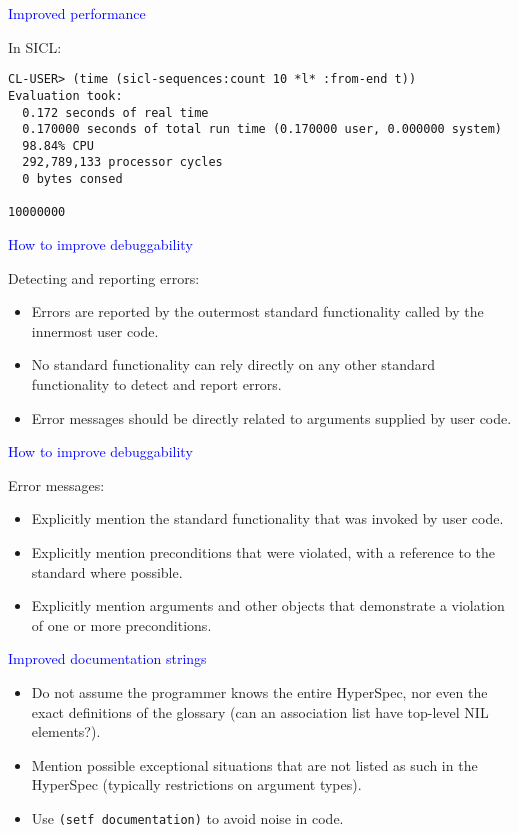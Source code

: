 \documentclass{slides}
\newcommand{\ti}[1]{\begin{center}\Large{\textcolor{blue}{#1}}\end{center}}
\begin{document}
\begin{slide}\ti{Improved performance}
In SICL:
\small
\begin{verbatim}
CL-USER> (time (sicl-sequences:count 10 *l* :from-end t))
Evaluation took:
  0.172 seconds of real time
  0.170000 seconds of total run time (0.170000 user, 0.000000 system)
  98.84% CPU
  292,789,133 processor cycles
  0 bytes consed
  
10000000
\end{verbatim}
\vfill\end{slide}
\begin{slide}\ti{How to improve debuggability}

Detecting and reporting errors:

\begin{itemize}
\item Errors are reported by the outermost standard functionality
  called by the innermost user code.
\item No standard functionality can rely directly on any other
  standard functionality to detect and report errors.
\item Error messages should be directly related to arguments supplied
  by user code.
\end{itemize}

\vfill\end{slide}
\begin{slide}\ti{How to improve debuggability}

Error messages:

\begin{itemize}
\item Explicitly mention the standard functionality that was invoked
  by user code.
\item Explicitly mention preconditions that were violated, with a
  reference to the standard where possible.
\item Explicitly mention arguments and other objects that demonstrate
  a violation of one or more preconditions.
\end{itemize}

\vfill\end{slide}
\begin{slide}\ti{Improved documentation strings}

\begin{itemize}
\item Do not assume the programmer knows the entire HyperSpec, nor
  even the exact definitions of the glossary (can an association list
  have top-level NIL elements?).
\item Mention possible exceptional situations that are not listed as
  such in the HyperSpec (typically restrictions on argument types). 
\item Use \texttt{(setf documentation)} to avoid noise in code. 
\end{itemize}

\vfill\end{slide}
\end{document}

